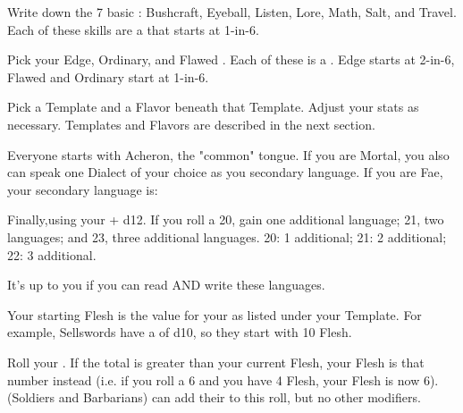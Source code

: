 {  Write down the 7 basic : Bushcraft, Eyeball, Listen, Lore, Math, Salt, and Travel.  Each of these skills are a \KNACK that starts at 1-in-6.



  Pick your Edge, Ordinary, and Flawed .  Each of these is a \KNACK.  Edge starts at 2-in-6, Flawed and Ordinary start at 1-in-6.

  \cbreak
  

  Pick a Template and a Flavor beneath that Template.  Adjust your stats as necessary.  Templates and Flavors  are described in the next section.



  Everyone starts with Acheron, the "common" tongue. If you are Mortal, you also can speak one Dialect of your choice as you secondary language.  If you are Fae, your secondary language is:

  Finally,\RO using your \INT + d12.  If you roll a 20, gain one additional language; 21, two languages; and 23, three additional languages. 20: 1 additional; 21: 2 additional; 22: 3 additional.

  It's up to you if you can read AND write these languages.



  Your starting Flesh is the \MAX value for your \HD as listed under your Template.  For example, Sellswords have a \HD of d10, so they start with 10 Flesh.  

  Roll your \VIG.  If the total is greater than your current Flesh, your Flesh is that number instead (i.e. if you roll a 6 and you have 4 Flesh, your Flesh is now 6).  (Soldiers and Barbarians) can add their \LVL to this roll, but no other modifiers.


}
